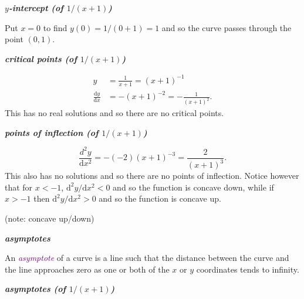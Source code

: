 \documentclass[
  english,
  11pt,
  oneside]{book}
\newcommand{\slide}{}
\theoremstyle{definition}
\theoremstyle{definition}
\theoremstyle{definition}
\theoremstyle{definition}
\theoremstyle{remark}
\begin{document}
\textbf{\emph{\(y\)-intercept (of \(1/(x+1)\))}}

\begin{notslides}

Put \(x=0\) to find \(y(0) = 1/(0+1) = 1\) and so the curve passes through the point \((0,1)\).

\end{notslides}

\slide

\textbf{\emph{critical points (of \(1/(x+1)\))}}

\begin{notslides}

\begin{align*}
y&=\frac1{x+1} = (x+1)^{-1}\\
\frac{\mathrm{d} y}{\mathrm{d} x} &= -(x+1)^{-2} = -\frac1{(x+1)^2}.
\end{align*}
This has no real solutions and so there are no critical points.

\end{notslides}

\slide

\textbf{\emph{points of inflection (of \(1/(x+1)\))}}

\begin{notslides}

\[
\frac{d^2y}{\mathrm{d} x^2} = -(-2)(x+1)^{-3} = \frac2{(x+1)^3}.
\]
This also has no solutions and so there are no points of inflection. Notice however that for \(x < -1\), \(\mathrm{d}^2y/\mathrm{d} x^2<0\) and so the function is concave down, while if \(x>-1\) then \(\mathrm{d}^2y/\mathrm{d} x^2 >0\) and so the function is concave up.

\end{notslides}

\begin{slidesonly}

\vfill (note: concave up/down)

\end{slidesonly}

\slide

\textbf{\emph{asymptotes}}

An \textcolor{purple}{\em asymptote} of a curve is a line such that the distance between the curve and the line approaches zero as one or both of the \(x\) or \(y\) coordinates tends to infinity.

\slide

\textbf{\emph{asymptotes (of \(1/(x+1)\))}}
\end{document}
